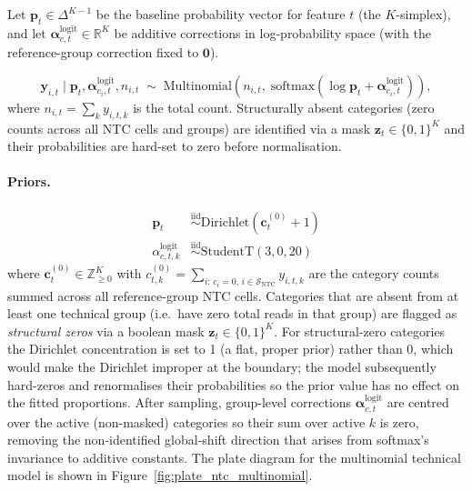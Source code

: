 \documentclass[12pt]{article}
\newcommand{\given}{\mid}
\newcommand{\iid}{\overset{\mathrm{iid}}{\sim}}
\begin{document}
Let $\mathbf{p}_t \in \Delta^{K-1}$ be the baseline probability vector for feature $t$
(the $K$-simplex), and let $\boldsymbol{\alpha}_{c,t}^{\mathrm{logit}} \in \mathbb{R}^K$
be additive corrections in log-probability space (with the reference-group correction
fixed to $\mathbf{0}$).

\begin{equation}
  \mathbf{y}_{i,t} \given \mathbf{p}_t, \boldsymbol{\alpha}_{c_i,t}^{\mathrm{logit}},
      n_{i,t}
    \;\sim\; \mathrm{Multinomial}\!\left(n_{i,t},\;
      \mathrm{softmax}\!\left(\log \mathbf{p}_t +
        \boldsymbol{\alpha}_{c_i,t}^{\mathrm{logit}}\right)\right),
\end{equation}
%
where $n_{i,t} = \sum_k y_{i,t,k}$ is the total count.
Structurally absent categories (zero counts across all NTC cells and groups) are identified
via a mask $\mathbf{z}_t \in \{0,1\}^K$ and their probabilities are hard-set to zero before
normalisation.

\paragraph{Priors.}

\begin{align}
  \mathbf{p}_t &\iid \mathrm{Dirichlet}\!\left(\mathbf{c}_t^{(0)} + 1\right)
    \label{eq:ntc_dirichlet} \\
  \alpha_{c,t,k}^{\mathrm{logit}} &\iid \mathrm{StudentT}(3, 0, 20)
    \label{eq:ntc_multi_alpha}
\end{align}
%
where $\mathbf{c}_t^{(0)} \in \mathbb{Z}_{\ge 0}^K$ with
$c_{t,k}^{(0)} = \sum_{i:\,c_i=0,\,i\in\mathcal{S}_{\mathrm{NTC}}} y_{i,t,k}$
are the category counts summed across all reference-group NTC cells.
Categories that are absent from at least one technical group (i.e.\ have zero total
reads in that group) are flagged as \emph{structural zeros} via a boolean mask
$\mathbf{z}_t \in \{0,1\}^K$.
For structural-zero categories the Dirichlet concentration is set to 1
(a flat, proper prior) rather than 0, which would make the Dirichlet improper at
the boundary; the model subsequently hard-zeros and renormalises their probabilities
so the prior value has no effect on the fitted proportions.
After sampling, group-level corrections $\boldsymbol{\alpha}_{c,t}^{\mathrm{logit}}$
are centred over the active (non-masked) categories so their sum over active $k$ is zero,
removing the non-identified global-shift direction that arises from softmax's invariance to additive constants.
The plate diagram for the multinomial technical model is shown in Figure~\ref{fig:plate_ntc_multinomial}.
\end{document}
